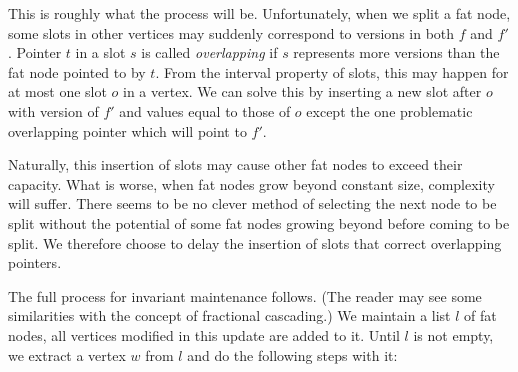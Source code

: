This is roughly what the process will be. Unfortunately, when we split a fat node, some slots in other vertices may suddenly correspond to versions in both $f$ and $f'$. Pointer $t$ in a slot $s$ is called \emph{overlapping} if $s$ represents more versions than the fat node pointed to by $t$.
From the interval property of slots, this may happen for at most one slot $o$ in a vertex. We can solve this by inserting a new slot after $o$ with version of $f'$ and values equal to those of $o$ except the one problematic overlapping pointer which will point to $f'$.

Naturally, this insertion of slots may cause other fat nodes to exceed their capacity. What is worse, when fat nodes grow beyond constant size, complexity will suffer. There seems to be no clever method of selecting the next node to be split without the potential of some fat nodes growing beyond  before coming to be split. We therefore choose to delay the insertion of slots that correct overlapping pointers.

The full process for invariant maintenance follows. (The reader may see some similarities with the concept of fractional cascading.) We maintain a list $l$ of fat nodes, all vertices modified in this update are added to it. Until $l$ is not empty, we extract a vertex $w$ from $l$ and do the following steps with it:

